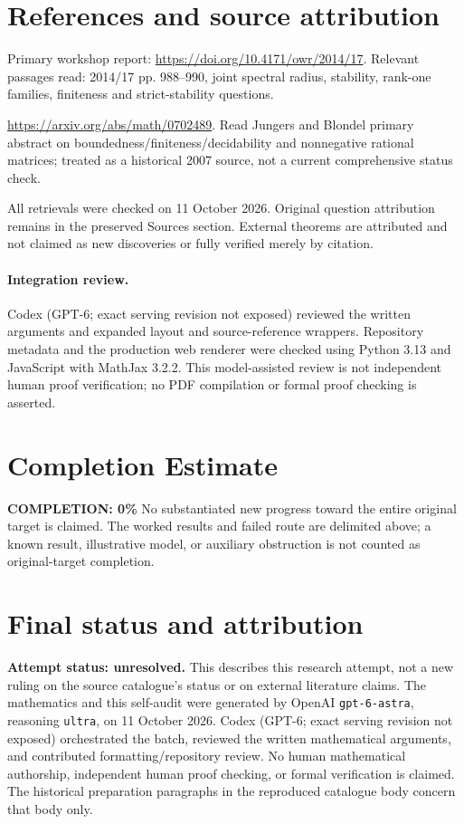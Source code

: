 \documentclass[11pt]{article}
\begin{document}
\section{References and source attribution}
Primary workshop report: \url{https://doi.org/10.4171/owr/2014/17}. Relevant passages read: 2014/17 pp. 988--990, joint spectral radius, stability, rank-one families, finiteness and strict-stability questions.

\url{https://arxiv.org/abs/math/0702489}. Read Jungers and Blondel primary abstract on boundedness/finiteness/decidability and nonnegative rational matrices; treated as a historical 2007 source, not a current comprehensive status check.

All retrievals were checked on 11 October 2026. Original question attribution remains in the preserved Sources section. External theorems are attributed and not claimed as new discoveries or fully verified merely by citation.


\paragraph{Integration review.} Codex (GPT-6; exact serving revision not exposed) reviewed the written arguments and expanded layout and source-reference wrappers. Repository metadata and the production web renderer were checked using Python 3.13 and JavaScript with MathJax 3.2.2. This model-assisted review is not independent human proof verification; no PDF compilation or formal proof checking is asserted.

\section{Completion Estimate}
\noindent\textbf{COMPLETION: 0\%}
No substantiated new progress toward the entire original target is claimed. The worked results and failed route are delimited above; a known result, illustrative model, or auxiliary obstruction is not counted as original-target completion.

\section{Final status and attribution}
\textbf{Attempt status: unresolved.} This describes this research attempt, not a new ruling on the source catalogue's status or on external literature claims.
The mathematics and this self-audit were generated by OpenAI \texttt{gpt-6-astra}, reasoning \texttt{ultra}, on 11 October 2026. Codex (GPT-6; exact serving revision not exposed) orchestrated the batch, reviewed the written mathematical arguments, and contributed formatting/repository review. No human mathematical authorship, independent human proof checking, or formal verification is claimed. The historical preparation paragraphs in the reproduced catalogue body concern that body only.
\end{document}

